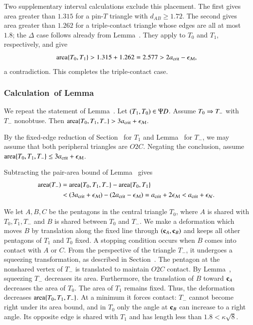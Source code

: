 Two supplementary interval calculations exclude this placement.
The first gives area greater than $1.315$ for a pin-$T$ triangle
with $d_{AB}\ge1.72$. The second gives area greater than $1.262$
for a triple-contact triangle whose edges are all at most $1.8$;
the $\Delta$ case follows already from Lemma~.
They apply to $T_0$ and $T_1$, respectively, and give
\[
{\operatorname{area}}\{T_0,T_1\}>1.315+1.262=2.577>2a_\text{crit}-\epsilon_{\mathcal M},
\]
a contradiction. This completes the triple-contact case.

\subsubsection{Calculation~of Lemma~}

We repeat the statement of Lemma~.  Let
$(T_1,T_0)\in\Psi D$. Assume $T_0\Rightarrow T_-$ with $T_-$ nonobtuse.  Then ${\operatorname{area}}\{T_0,T_1,T_-\} >
3a_\text{crit} + \epsilon_{\mathcal M}$. %

By the fixed-edge reduction of Section~ for $T_1$ and
Lemma~ for $T_-$, we may assume that both
peripheral triangles are $O2C$.  Negating the conclusion, assume
${\operatorname{area}}\{T_0,T_1,T_-\}\le3a_\text{crit}+\epsilon_{\mathcal M}$.

Subtracting the pair-area bound of
Lemma~ gives
\begin{align*}
{\operatorname{area}}(T_-) &= {\operatorname{area}}\{T_0,T_1,T_-\} - {\operatorname{area}}\{T_0,T_1\} \\
&< (3a_\text{crit}+\epsilon_{\mathcal M}) - (2a_\text{crit} - \epsilon_{\mathcal M}) = a_\text{crit} + 2\epsilon_{\mathcal M} < a_\text{crit}+\epsilon_{\mathcal N}.
\end{align*}

We let $A,B,C$ be the pentagons in the central triangle $T_0$, where
$A$ is shared with $T_0,T_1,T_-$ and $B$ is shared between $T_0$ and
$T_-$.  We make a deformation which moves $B$ by translation along the
fixed line through $({\mathbf c}_A,{\mathbf c}_B)$ and keeps all other pentagons of
$T_1$ and $T_0$ fixed.  A stopping condition occurs when $B$ comes
into contact with $A$ or $C$.  From the perspective of the triangle
$T_-$, it undergoes a squeezing transformation, as described in
Section~.  The pentagon at the nonshared vertex of
$T_-$ is translated to maintain $O2C$ contact. By
Lemma~, squeezing $T_-$ decreases its area.
Furthermore, the translation of $B$ toward ${\mathbf c}_A$ decreases the area
of $T_0$.  The area of $T_1$ remains fixed.  Thus, the deformation
decreases ${\operatorname{area}}\{T_0,T_1,T_-\}$. At a minimum it forces contact:
$T_-$ cannot become right under its area bound, and in $T_0$ only
the angle at ${\mathbf c}_B$ can increase to a right angle. Its opposite edge
is shared with $T_1$ and has length less than $1.8<\kappa\sqrt8$.

